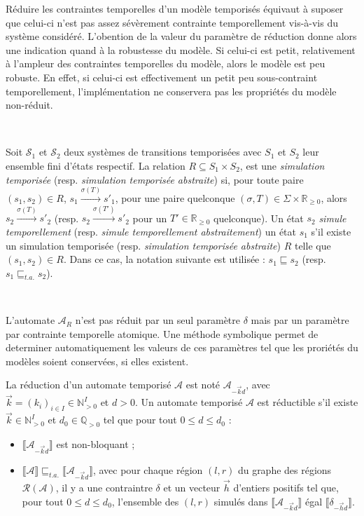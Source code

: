       Réduire les contraintes temporelles d'un modèle temporisés équivaut à
      suposer que celui-ci n'est pas assez sévèrement contrainte temporellement
      vis-à-vis du système considéré. L'obention de la valeur du paramètre de
      réduction donne alors une indication quand à la robustesse du modèle. Si
      celui-ci est petit, relativement à l'ampleur des contraintes temporelles
      du modèle, alors le modèle est peu robuste. En effet, si celui-ci est
      effectivement un petit peu sous-contraint temporellement, l'implémentation
      ne conservera pas les propriétés du modèle non-réduit.

      ~
      
      Soit $\mathcal{S}_1$ et $\mathcal{S}_2$ deux systèmes de transitions
      temporisées avec $S_1$ et $S_2$ leur ensemble fini d'états respectif.  La
      relation $R \subseteq S_1 \times S_2$, est une {\em simulation temporisée}
      (resp. {\em simulation temporisée abstraite}) si, pour toute paire $(s_1,
      s_2) \in R$, $s_1 \xrightarrow{\sigma(T)} s'_1$, pour une paire quelconque
      $(\sigma, T) \in \Sigma \times \mathbb{R}_{\geq 0}$, alors $s_2
      \xrightarrow{\sigma(T)} s'_2$ (resp. $s_2 \xrightarrow{\sigma(T')} s'_2$
      pour un $T' \in \mathbb{R}_{\geq 0}$ quelconque). Un état $s_2$ {\em
        simule temporellement} (resp. {\em simule temporellement abstraitement})
      un état $s_1$ s'il existe un simulation temporisée (resp. {\em simulation
        temporisée abstraite}) $R$ telle que $(s_1, s_2) \in R$. Dans ce cas, la
      notation suivante est utilisée : $s_1 \sqsubseteq s_2$ (resp. $s_1
      \sqsubseteq_{t.a.} s_2$).
      
      ~

      L'automate $\mathcal{A}_R$ n'est pas réduit par un seul paramètre $\delta$
      mais par un paramètre par contrainte temporelle atomique. Une méthode
      symbolique permet de determiner automatiquement les valeurs de ces
      paramètres tel que les proriétés du modèles soient conservées, si elles
      existent.

      La réduction d'un automate temporisé $\mathcal{A}$ est noté
      $\mathcal{A}_{-\vec{k}d}$, avec $\vec{k} = (k_i)_{i \in I} \in
      \mathbb{N}^I_{>0}$ et $d > 0$. Un automate temporisé $\mathcal{A}$ est
      réductible s'il existe $\vec{k} \in \mathbb{N}^I_{>0}$ et $d_0 \in
      \mathbb{Q}_{>0}$ tel que pour tout $0 \leq d \leq d_0$ :
      
      \begin{itemize}
        \item $\llbracket\mathcal{A}_{-\vec{k}d}\rrbracket$ est non-bloquant ;
        \item $\llbracket\mathcal{A}\rrbracket \sqsubseteq_{t.a.}
          \llbracket\mathcal{A}_{-\vec{k}d}\rrbracket$, avec pour chaque région
          $(l,r)$ du graphe des régions $\mathcal{R}(\mathcal{A})$, il y a une
          contraintre $\delta$ et un vecteur $\vec{h}$ d'entiers positifs tel
          que, pour tout $0 \leq d \leq d_0$, l'ensemble des $(l,r)$ simulés
          dans $\llbracket\mathcal{A}_{-\vec{k}d}\rrbracket$ égal
          $\llbracket\delta_{-\vec{h}d}\rrbracket$.
      \end{itemize}
      
